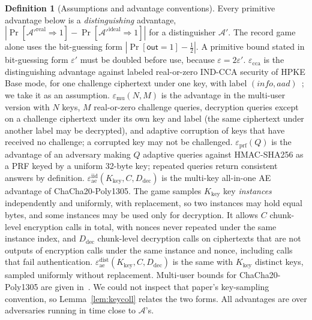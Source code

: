 \documentclass[pdflatex,sn-mathphys-num,twocolumn]{sn-jnl}
\theoremstyle{plain}
\theoremstyle{definition}
\newtheorem{definition}[theorem]{Definition}
\begin{document}
\begin{definition}[Assumptions and advantage conventions]\label{def:assumptions}
Every primitive advantage below is a \emph{distinguishing} advantage, $|\Pr[\mathcal A'^{\mathrm{real}}\Rightarrow1]-\Pr[\mathcal A'^{\mathrm{ideal}}\Rightarrow1]|$ for a distinguisher $\mathcal A'$. The record game alone uses the bit-guessing form $|\Pr[\mathsf{out}=1]-\tfrac12|$. A primitive bound stated in bit-guessing form $\varepsilon'$ must be doubled before use, because $\varepsilon=2\varepsilon'$.
$\varepsilon_{\mathrm{cca}}$ is the distinguishing advantage against labeled real-or-zero IND-CCA security of HPKE Base mode, for one challenge ciphertext under one key, with label $(\mathit{info},\mathit{aad})$~\cite{rfc9180}; we take it as an assumption. $\varepsilon_{\mathrm{mu}}(N,M)$ is the advantage in the multi-user version with $N$ keys, $M$ real-or-zero challenge queries, decryption queries except on a challenge ciphertext under its own key and label (the same ciphertext under another label may be decrypted), and adaptive corruption of keys that have received no challenge; a corrupted key may not be challenged. $\varepsilon_{\mathrm{prf}}(Q)$ is the advantage of an adversary making $Q$ adaptive queries against HMAC-SHA256 as a PRF keyed by a uniform 32-byte key; repeated queries return consistent answers by definition. $\varepsilon^{\mathrm{iid}}_{\mathrm{ae}}(K_{\mathrm{key}},C,D_{\mathrm{dec}})$ is the multi-key all-in-one AE advantage of ChaCha20-Poly1305. The game samples $K_{\mathrm{key}}$ key \emph{instances} independently and uniformly, with replacement, so two instances may hold equal bytes, and some instances may be used only for decryption. It allows $C$ chunk-level encryption calls in total, with nonces never repeated under the same instance index, and $D_{\mathrm{dec}}$ chunk-level decryption calls on ciphertexts that are not outputs of encryption calls under the same instance and nonce, including calls that fail authentication. $\varepsilon^{\mathrm{dist}}_{\mathrm{ae}}(K_{\mathrm{key}},C,D_{\mathrm{dec}})$ is the same with $K_{\mathrm{key}}$ distinct keys, sampled uniformly without replacement. Multi-user bounds for ChaCha20-Poly1305 are given in~\cite{degabriele2021}. We could not inspect that paper's key-sampling convention, so Lemma~\ref{lem:keycoll} relates the two forms. All advantages are over adversaries running in time close to $\mathcal A$'s.
\end{definition}
\end{document}

